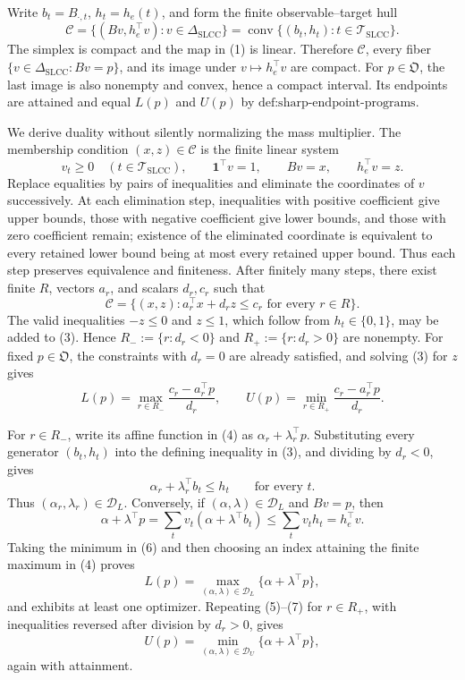 Write \(b_t=B_{\cdot,t}\), \(h_t=h_e(t)\), and form the finite observable--target hull
\[
\mathcal C=\{(Bv,h_e^{\top}v):v\in\Delta_{\mathrm{SLCC}}\}
=\operatorname{conv}\{(b_t,h_t):t\in\mathcal T_{\mathrm{SLCC}}\}.
\tag{1}
\]
The simplex is compact and the map in (1) is linear.  Therefore \(\mathcal C\), every fiber \(\{v\in\Delta_{\mathrm{SLCC}}:Bv=p\}\), and its image under \(v\mapsto h_e^{\top}v\) are compact.  For \(p\in\mathfrak O\), the last image is also nonempty and convex, hence a compact interval.  Its endpoints are attained and equal \(L(p)\) and \(U(p)\) by \(\text{def:sharp-endpoint-programs}\).

We derive duality without silently normalizing the mass multiplier.  The membership condition \((x,z)\in\mathcal C\) is the finite linear system
\[
v_t\geq0\quad(t\in\mathcal T_{\mathrm{SLCC}}),
\qquad
\mathbf 1^{\top}v=1,
\qquad
Bv=x,
\qquad
h_e^{\top}v=z.
\tag{2}
\]
Replace equalities by pairs of inequalities and eliminate the coordinates of \(v\) successively.  At each elimination step, inequalities with positive coefficient give upper bounds, those with negative coefficient give lower bounds, and those with zero coefficient remain; existence of the eliminated coordinate is equivalent to every retained lower bound being at most every retained upper bound.  Thus each step preserves equivalence and finiteness.  After finitely many steps, there exist finite \(R\), vectors \(a_r\), and scalars \(d_r,c_r\) such that
\[
\mathcal C=\{(x,z):a_r^{\top}x+d_rz\leq c_r\text{ for every }r\in R\}.
\tag{3}
\]
The valid inequalities \(-z\leq0\) and \(z\leq1\), which follow from \(h_t\in\{0,1\}\), may be added to (3).  Hence \(R_-:=\{r:d_r<0\}\) and \(R_+:=\{r:d_r>0\}\) are nonempty.  For fixed \(p\in\mathfrak O\), the constraints with \(d_r=0\) are already satisfied, and solving (3) for \(z\) gives
\[
L(p)=\max_{r\in R_-}\frac{c_r-a_r^{\top}p}{d_r},
\qquad
U(p)=\min_{r\in R_+}\frac{c_r-a_r^{\top}p}{d_r}.
\tag{4}
\]

For \(r\in R_-\), write its affine function in (4) as \(\alpha_r+\lambda_r^{\top}p\).  Substituting every generator \((b_t,h_t)\) into the defining inequality in (3), and dividing by \(d_r<0\), gives
\[
\alpha_r+\lambda_r^{\top}b_t\leq h_t
\qquad\text{for every }t.
\tag{5}
\]
Thus \((\alpha_r,\lambda_r)\in\mathcal D_L\).  Conversely, if \((\alpha,\lambda)\in\mathcal D_L\) and \(Bv=p\), then
\[
\alpha+\lambda^{\top}p
=\sum_t v_t(\alpha+\lambda^{\top}b_t)
\leq\sum_tv_th_t=h_e^{\top}v.
\tag{6}
\]
Taking the minimum in (6) and then choosing an index attaining the finite maximum in (4) proves
\[
L(p)=\max_{(\alpha,\lambda)\in\mathcal D_L}
\{\alpha+\lambda^{\top}p\},
\tag{7}
\]
and exhibits at least one optimizer.  Repeating (5)--(7) for \(r\in R_+\), with inequalities reversed after division by \(d_r>0\), gives
\[
U(p)=\min_{(\alpha,\lambda)\in\mathcal D_U}
\{\alpha+\lambda^{\top}p\},
\tag{8}
\]
again with attainment.

